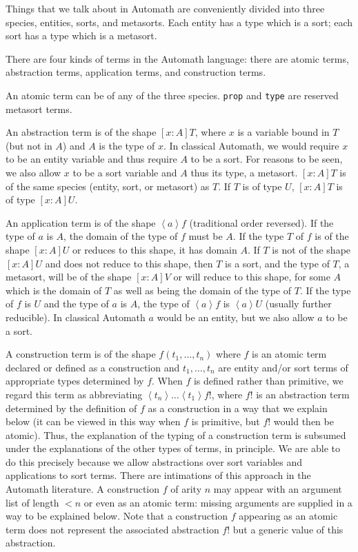 \documentclass[submission,copyright,creativecommons]{eptcs}
\begin{document}
Things that we talk about in Automath are conveniently divided into three species, entities, sorts, and metasorts.  Each entity has a type which is a sort;  each sort has a type which is a metasort.

There are four kinds of terms in the Automath language:  there are atomic terms, abstraction terms, application terms, and construction terms.

An atomic term can be of any of the three species.  {\tt prop} and {\tt type} are reserved metasort terms.

An abstraction term is of the shape $[x:A]T$, where $x$ is a variable bound in $T$ (but not in $A$) and $A$ is the type of $x$.  In classical Automath, we would require $x$ to be an entity variable and thus require $A$ to be a sort.  For reasons to be seen, we also allow $x$ to be a sort variable and $A$ thus its type, a metasort.  $[x:A]T$ is of the same species (entity, sort, or metasort) as $T$.  If $T$ is of type $U$,
$[x:A]T$ is of type $[x:A]U$.

An application term is of the shape $\left<a\right>f$ (traditional order reversed).  If the type of $a$ is $A$, the domain of the type of $f$ must be $A$.  If the type $T$ of $f$  is of the shape $[x:A]U$ or reduces to this shape, it has domain $A$.  If $T$ is not of the shape $[x:A]U$ and does not reduce to this shape, then $T$ is a sort, and the type of $T$, a metasort, will be of the shape $[x:A]V$ or will reduce to this shape, for some $A$ which is the domain of $T$ as well as being the domain of the type of $T$.  If the type of $f$ is $U$ and the type of $a$ is $A$, the type of $\left<a\right>f$ is $\left<a\right>U$ (usually further reducible).  In classical Automath $a$ would be an entity, but we also  allow $a$ to be a sort.

A construction term is of the shape $f(t_1,\ldots,t_n)$ where $f$ is an atomic term declared or defined as a construction and $t_1,\ldots,t_n$ are entity and/or sort terms of appropriate types determined by $f$.  When $f$ is defined rather than primitive, we regard this term as abbreviating $\left<t_n\right>\ldots\left<t_1\right>f!$, where $f!$ is an abstraction term determined by the definition of $f$ as a construction in a way that we explain below (it can be viewed in this way when $f$ is primitive, but $f!$ would then be atomic).  Thus, the explanation of the typing of a construction term is subsumed under the explanations of the other types of terms, in principle.  We are able to do this precisely because we allow abstractions over sort variables and applications to sort terms.  There are intimations of this approach in the Automath literature.  A construction $f$ of arity $n$ may appear with an argument list of length $<n$ or even as an atomic term:  missing arguments are supplied in a way to be explained below.  Note that a construction $f$ appearing as an atomic term does not represent the associated abstraction $f!$ but a generic value of this abstraction.
\end{document}
